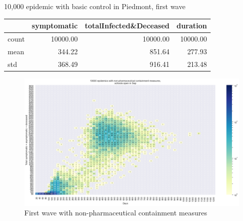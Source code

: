 \documentclass[8pt]{beamer}
\begin{document}
\begin{frame}{10,000 epidemic with basic control in Piedmont, first wave}


\begin{table}[H]
\center
\tiny

\begin{tabular}{lrrr}
\toprule
{} &  symptomatic &  totalInfected\&Deceased &  duration \\
\midrule
count &     10000.00 &                10000.00 &  10000.00 \\
mean  &       344.22 &                  851.64 &    277.93 \\
std   &       368.49 &                  916.41 &    213.48 \\
\bottomrule
\end{tabular}

\label{basicCTab}
\end{table}

\begin{figure}[H]
\center
\includegraphics[scale=0.22]{10kBasicC.png}
\caption{First wave with non-pharmaceutical containment measures} 
\label{basicC}
\end{figure}

\end{frame}
\end{document}
